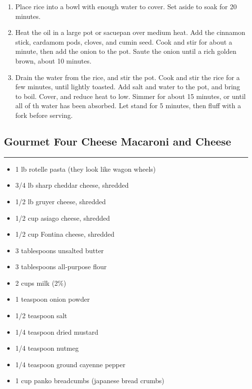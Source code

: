 \documentclass{article}
\begin{document}
\begin{enumerate}
    \item 
        Place rice into a bowl with enough water to cover. Set aside to soak for 20 minutes.
    \item 
        Heat the oil in a large pot or sacuepan over medium heat. Add the cinnamon stick, cardamom pods, cloves, and cumin seed. Cook and stir for about a minute, then add the onion to the pot. Saute the onion until a rich golden brown, about 10 minutes.
    \item 
        Drain the water from the rice, and stir the pot. Cook and stir the rice for a few minutes, until lightly toasted. Add salt and water to the pot, and bring to boil. Cover, and reduce heat to low. Simmer for about 15 minutes, or until all of th water has been absorbed. Let stand for 5 minutes, then fluff with a fork before serving.
\end{enumerate}
\newpage

\subsection{Gourmet Four Cheese Macaroni and Cheese} 
\noindent\rule[0.5ex]{\linewidth}{1pt}

\begin{framed}
    \begin{itemize}
        \item 1 lb rotelle pasta (they look like wagon wheels)
        \item 3/4 lb sharp cheddar cheese, shredded
        \item 1/2 lb gruyer cheese, shredded
        \item 1/2 cup asiago cheese, shredded
        \item 1/2 cup Fontina cheese, shredded
        \item 3 tablespoons unsalted butter
        \item 3 tablespoons all-purpose flour
        \item 2 cups milk (2\%)
        \item 1 teaspoon onion powder
        \item 1/2 teaspoon salt
        \item 1/4 teaspoon dried mustard
        \item 1/4 teaspoon nutmeg
        \item 1/4 teaspoon ground cayenne pepper
        \item 1 cup panko breadcumbs (japanese bread crumbs)
    \end{itemize}
\end{framed}
\end{document}
